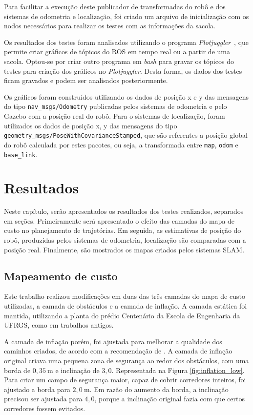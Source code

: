 \documentclass[repeatfields,xlists,xpacks,oneside,yearsonly]{ufrgscca}
\begin{document}
Para facilitar a execução deste publicador de transformadas do robô e
dos sistemas de odometria e localização, foi criado um arquivo de
inicialização com os nodos necessários para realizar os testes com as
informações da sacola.

Os resultados dos testes foram analisados utilizando o programa
\textit{Plotjuggler}~\cite{plotjuggler}, que permite criar gráficos
de tópicos do ROS em tempo real ou a partir de uma sacola. Optou-se
por criar outro programa em \textit{bash} para gravar os tópicos do
testes para criação dos gráficos no \textit{Plotjuggler}. Desta
forma, os dados dos testes ficam gravados e podem ser analisados
posteriormente.

Os gráficos foram construídos utilizando os dados de posição x e y
das mensagens do tipo \texttt{nav\_msgs/Odometry} publicadas pelos
sistemas de odometria e pelo Gazebo com a posição real do robô. Para
o sistemas de localização, foram utilizados os dados de posição x, y
das mensagens do tipo
\texttt{geometry\_msgs/PoseWithCovarianceStamped}, que são referentes
a posição global do robô calculada por estes pacotes, ou seja, a
transformada entre \texttt{map}, \texttt{odom} e \texttt{base\_link}.

\chapter{Resultados}
\label{resultados}

Neste capítulo, serão apresentados os resultados dos testes
realizados, separados em seções. Primeiramente será apresentado o
efeito das camadas do mapa de custo no planejamento de trajetórias.
Em seguida, as estimativas de posição do robô, produzidas pelos
sistemas de odometria, localização são comparadas com a posição real.
Finalmente, são mostrados os mapas criados pelos sistemas SLAM.

\section{Mapeamento de custo}

Este trabalho realizou modificações em duas das três camadas do mapa
de custo utilizadas, a camada de obstáculos e a camada de inflação. A
camada estática foi mantida, utilizando a planta do prédio Centenário
da Escola de Engenharia da UFRGS, como em trabalhos antigos.

A camada de inflação porém, foi ajustada para melhorar a qualidade
dos caminhos criados, de acordo com a recomendação de
\textcite{ros_tuning_guide}. A camada de inflação original criava uma
pequena zona de segurança ao redor dos obstáculos, com uma borda de
$0,35~\si{\meter}$ e inclinação de $3,0$. Representada na Figura
\ref{fig:inflation_low}. Para criar um campo de segurança maior,
capaz de cobrir corredores inteiros, foi ajustado a borda para
$2,0~\si{\meter}$. Em razão do aumento da borda, a inclinação
precisou ser ajustada para $4,0$, porque a inclinação original fazia
com que certos corredores fossem evitados.
\end{document}
